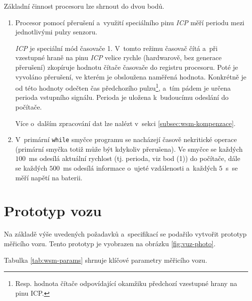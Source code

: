 Základní činnost procesoru lze shrnout do dvou bodů.

\begin{enumerate}
\item Procesor pomocí přerušení a~využití speciálního pinu \textit{\gls{ICP}}
měří periodu mezi jednotlivými pulzy senzoru.

\textit{\gls{ICP}} je speciální mód časovače 1. V~tomto režimu časovač čítá
a~při vzestupné hraně na pinu \textit{\gls{ICP}} velice rychle (hardwarově, bez
generace přerušení) zkopíruje hodnotu čítače časovače do registru procesoru.
Poté je vyvoláno přerušení, ve kterém je obsloužena naměřená hodnota. Konkrétně
je od této hodnoty odečten čas předchozího pulzu\footnote{Resp. hodnota čítače
odpovídající okamžiku předchozí vzestupné hrany na pinu \gls{ICP}.}, a~tím pádem
je určena perioda vstupního signálu. Perioda je uložena k~budoucímu odeslání do
počítače.

Více o~dalším zpracování dat lze nalézt v~sekci
\ref{subsec:wsm-kompenzace}.

\item V~primární \texttt{while} smyčce programu se nacházejí časově nekritické
operace (primární smyčka totiž může být kdykoliv přerušena). Ve
smyčce se každých $100$~ms odesílá aktuální rychlost (tj. perioda, viz bod (1))
do počítače, dále se každých $500$~ms odesílá informace o~ujeté vzdálenosti
a~každých $5$~s~se měří napětí na baterii.

\end{enumerate}

\section{Prototyp vozu}
\label{sec:wsm-prototype}

Na základě výše uvedených požadavků a~specifikací se podařilo vytvořit prototyp
měřicího vozu. Tento prototyp je vyobrazen na obrázku \ref{fig:vuz-photo}.

Tabulka \ref{tab:wsm-params} shrnuje klíčové parametry měřicího vozu.

